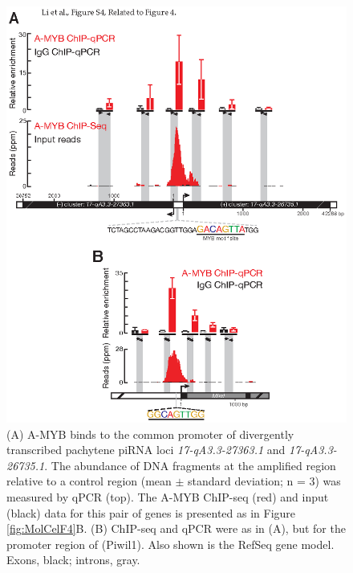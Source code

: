     \begin{figure}[htbp] %
      \centering 
      \includegraphics{Figures/MolCel/MolCel2013_FigS4.eps}
      \caption[ChIP-qPCR Confirms ChIP-seq Data]
      {
     	 (A) A-MYB binds to the common promoter of divergently transcribed pachytene piRNA loci \textit{17-qA3.3-27363.1} and \textit{17-qA3.3-26735.1}. The abundance of DNA fragments at the amplified region relative to a control region (mean $\pm$ standard deviation; n = 3) was measured by qPCR (top). The A-MYB ChIP-seq (red) and input (black) data for this pair of genes is presented as in Figure \ref{fig:MolCelF4}B. (B) ChIP-seq and qPCR were as in (A), but for the promoter region of \miwi{} (Piwil1). Also shown is the RefSeq gene model. Exons, black; introns, gray.
     	 }
      \label{fig:MolCelS4}
    	\end{figure}

